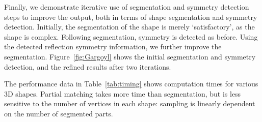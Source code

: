 Finally, we demonstrate iterative use of segmentation and symmetry detection steps to improve the output,  both in terms of shape segmentation and symmetry detection.
Initially, the segmentation of the shape
is merely `satisfactory', as the shape is complex.
Following segmentation,  symmetry is detected as before. Using the detected reflection symmetry information, we further improve the segmentation.
Figure~\ref{fig:Gargoyl} shows the initial segmentation and symmetry detection, and the refined results after two iterations.


The performance data in Table~\ref{tab:timing} shows computation times for various 3D shapes.
Partial matching takes more time than segmentation, but is less sensitive to the number of vertices in each shape: sampling is linearly dependent on the number of segmented parts.

